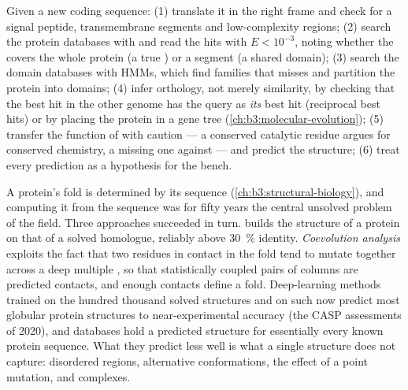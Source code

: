 \begin{method}\label{met:b3:bioinformatics:annotate}
Given a new coding sequence: (1) translate it in the right frame and
check for a signal peptide, transmembrane segments and low-complexity
regions; (2) search the protein databases with  and read the hits
with $E < 10^{-3}$, noting whether the  covers the whole
protein (a true ) or a segment (a shared domain); (3) search
the domain databases with  HMMs, which find families that 
misses and partition the protein into domains; (4) infer orthology, not
merely similarity, by checking that the best hit in the other genome
has the query as \emph{its} best hit (reciprocal best hits) or by
placing the protein in a gene tree (\cref{ch:b3:molecular-evolution});
(5) transfer the function of  with caution --- a conserved
catalytic residue argues for conserved chemistry, a missing one against
--- and predict the structure; (6) treat every prediction as a
hypothesis for the bench.
\end{method}

\begin{proposition}\label{prop:b3:bioinformatics:structure}
A protein's fold is determined by its sequence
(\cref{ch:b3:structural-biology}), and computing it from the sequence
was for fifty years the central unsolved problem of the field. Three
approaches succeeded in turn. \emph{} builds the
structure of a protein on that of a solved homologue, reliably above
\qty{30}{\%} identity. \emph{Coevolution analysis} exploits the fact
that two residues in contact in the fold tend to mutate together
across a deep multiple , so that statistically coupled pairs
of columns are predicted contacts, and enough contacts define a fold.
Deep-learning methods trained on the hundred thousand solved
structures and on such  now predict most globular protein
structures to near-experimental accuracy (the CASP assessments of
2020), and databases hold a predicted structure for essentially every
known protein sequence. What they predict less well is what a single
structure does not capture: disordered regions, alternative
conformations, the effect of a point mutation, and complexes.
\end{proposition}

